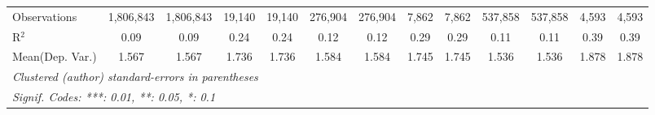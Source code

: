 \begin{tabular}{lcccccccccccc}
   Observations                             & 1,806,843     & 1,806,843       & 19,140        & 19,140         & 276,904       & 276,904         & 7,862       & 7,862          & 537,858       & 537,858        & 4,593         & 4,593\\  
   R$^2$                                    & 0.09          & 0.09            & 0.24          & 0.24           & 0.12          & 0.12            & 0.29        & 0.29           & 0.11          & 0.11           & 0.39          & 0.39\\  
Mean(Dep. Var.) & 1.567 & 1.567 & 1.736 & 1.736 & 1.584 & 1.584 & 1.745 & 1.745 & 1.536 & 1.536 & 1.878 & 1.878 \\
   \midrule \midrule
   \multicolumn{13}{l}{\emph{Clustered (author) standard-errors in parentheses}}\\
   \multicolumn{13}{l}{\emph{Signif. Codes: ***: 0.01, **: 0.05, *: 0.1}}\\
\end{tabular}
\par\endgroup
